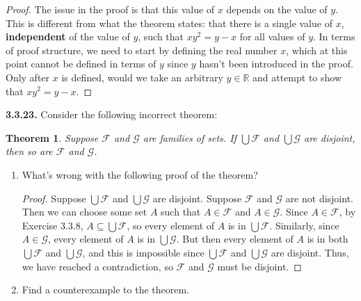 \documentclass[12pt]{amsart}
\newenvironment{statement}[1]{\smallskip\noindent\color[rgb]{.6627, .3529, .6314} {\bf #1.}}{}
\newtheorem{theorem}{Theorem}
\theoremstyle{definition}
\theoremstyle{remark}
\newcommand{\BR}{\mathbb R}
\begin{document}
\begin{proof}
The issue in the proof is that this value of $x$ depends on the value of $y$.
This is different from what the theorem states: that there is a single value of $x$, \textbf{independent} of the value of $y$, such that $xy^2 = y - x$ for all values of $y$.
In terms of proof structure, we need to start by defining the real number $x$, which at this point cannot be defined in terms of $y$ since $y$ hasn't been introduced in the proof.
Only after $x$ is defined, would we take an arbitrary $y \in \BR$ and attempt to show that $xy^2 = y - x$.
\end{proof}


\begin{statement}{3.3.23}
Consider the following incorrect theorem:
\begin{theorem}
	Suppose $\mathcal{F}$ and $\mathcal{G}$ are families of sets.
	If $\bigcup \mathcal{F}$ and $\bigcup \mathcal{G}$ are disjoint,
	then so are $\mathcal{F}$ and $\mathcal{G}$.
\end{theorem}
\begin{enumerate}
	\item What's wrong with the following proof of the theorem?
	\begin{proof}
		Suppose $\bigcup \mathcal{F}$ and $\bigcup \mathcal{G}$ are disjoint.
		Suppose $\mathcal{F}$ and $\mathcal{G}$ are not disjoint.
		Then we can choose some set $A$ such that $A \in \mathcal{F}$ and $A \in \mathcal{G}$.
		Since $A \in \mathcal{F}$, by Exercise 3.3.8, $A \subseteq \bigcup \mathcal{F}$,
		so every element of $A$ is in $\bigcup \mathcal{F}$.
		Similarly, since $A \in \mathcal{G}$, every element of $A$ is in $\bigcup \mathcal{G}$.
		But then every element of $A$ is in both $\bigcup \mathcal{F}$ and $\bigcup \mathcal{G}$,
		and this is impossible since $\bigcup \mathcal{F}$ and $\bigcup \mathcal{G}$ are disjoint.
		Thus, we have reached a contradiction, 
		so $\mathcal{F}$ and $\mathcal{G}$ must be disjoint.
	\end{proof}
	
	\item Find a counterexample to the theorem.
\end{enumerate}
\end{statement}
\end{document}
